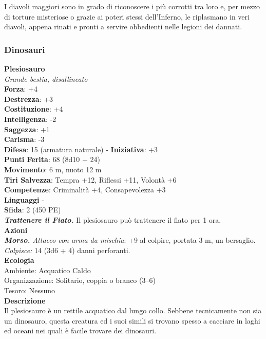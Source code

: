 \begin{multicols}{2}
I diavoli maggiori sono in grado di riconoscere i più corrotti tra loro e, per mezzo di torture misteriose o grazie ai poteri stessi dell'Inferno, le riplasmano in veri diavoli, appena rinati e pronti a servire obbedienti nelle legioni dei dannati.\\

\subsubsection{Dinosauri}

\medskip\textbf{Plesiosauro}\\
\emph{Grande bestia, disallineato}\\
\textbf{Forza}: +4\\
\textbf{Destrezza}: +3\\
\textbf{Costituzione}: +4\\
\textbf{Intelligenza}: -2\\
\textbf{Saggezza}: +1\\
\textbf{Carisma}: -3\\
\textbf{Difesa}: 15 (armatura naturale) - \textbf{Iniziativa}: +3\\
\textbf{Punti Ferita}: 68 (8d10 + 24)\\
\textbf{Movimento}: 6 m, nuoto 12 m\\
\textbf{Tiri Salvezza}: Tempra +12, Riflessi +11, Volontà +6\\
\textbf{Competenze}: Criminalità +4, Consapevolezza +3\\
\textbf{Linguaggi} -\\
\textbf{Sfida}: 2 (450 PE)\smallskip\\
\emph{\textbf{Trattenere il Fiato.}} Il plesiosauro può trattenere il fiato per 1 ora.\\
\smallskip\textbf{Azioni}\\
\emph{\textbf{Morso.} Attacco con arma da mischia}: +9 al colpire, portata 3 m, un bersaglio.\\
\emph{Colpisce:} 14 (3d6 + 4) danni perforanti. \\
\textbf{Ecologia}\\
Ambiente: Acquatico Caldo\\
Organizzazione: Solitario, coppia o branco (3–6)\\
Tesoro: Nessuno\\
\textbf{Descrizione}\\
Il plesiosauro è un rettile acquatico dal lungo collo. Sebbene tecnicamente non sia un dinosauro, questa creatura ed i suoi simili si trovano spesso a cacciare in laghi ed oceani nei quali è facile trovare dei dinosauri.\\


\end{multicols}
